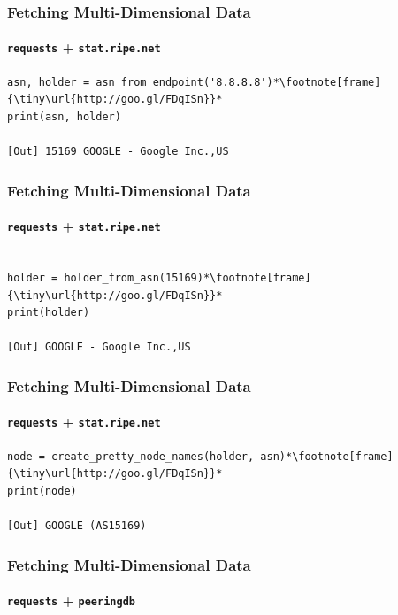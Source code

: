 \begin{frame}[fragile]
  \frametitle{Fetching Multi-Dimensional Data}
  \framesubtitle{\texttt{requests} + \texttt{stat.ripe.net}}
    \begin{lstlisting}
asn, holder = asn_from_endpoint('8.8.8.8')*\footnote[frame]{\tiny\url{http://goo.gl/FDqISn}}*
print(asn, holder)

[Out] 15169 GOOGLE - Google Inc.,US

    \end{lstlisting}
\end{frame}


\begin{frame}[fragile]
  \frametitle{Fetching Multi-Dimensional Data}
  \framesubtitle{\texttt{requests} + \texttt{stat.ripe.net}}
    \begin{lstlisting}

holder = holder_from_asn(15169)*\footnote[frame]{\tiny\url{http://goo.gl/FDqISn}}*
print(holder)

[Out] GOOGLE - Google Inc.,US

    \end{lstlisting}
\end{frame}


\begin{frame}[fragile]
  \frametitle{Fetching Multi-Dimensional Data}
  \framesubtitle{\texttt{requests} + \texttt{stat.ripe.net}}
    \begin{lstlisting}
node = create_pretty_node_names(holder, asn)*\footnote[frame]{\tiny\url{http://goo.gl/FDqISn}}*
print(node)

[Out] GOOGLE (AS15169)
    \end{lstlisting}
\end{frame}


\begin{frame}[fragile]
  \frametitle{Fetching Multi-Dimensional Data}
  \framesubtitle{\texttt{requests} + \texttt{peeringdb}}
\end{frame}


